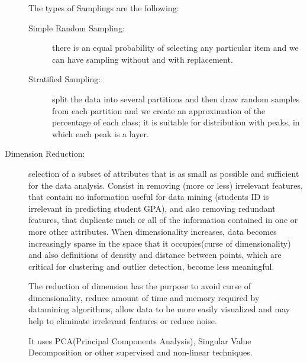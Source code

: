 \begin{description}
                             The types of Samplings are the following:
                             \begin{description}
                                 \item [Simple Random Sampling: ] there is an equal probability of selecting
                                        any particular item and we can have sampling without and with replacement.
                                 \item [Stratified Sampling: ] split the data into several partitions and 
                                        then draw random samples from each partition and we create an
                                        approximation of the percentage of each class; it is suitable 
                                        for distribution with peaks, in which each peak is a layer.
                             \end{description}
    \item [Dimension Reduction: ] selection of a subset of attributes that is as small as possible
                                  and sufficient for the data analysis.\newline
                                  Consist in removing (more or less) irrelevant features, that contain no 
                                  information useful for data mining (students ID is irrelevant in predicting 
                                  student GPA), and also removing redundant features, that duplicate much or 
                                  all of the information contained in one or more other attributes.\newline
                                  When dimensionality increases, data becomes increasingly sparse in the
                                  space that it occupies(curse of dimensionality) and also definitions of
                                  density and distance between points, which are critical for clustering
                                  and outlier detection, become less meaningful.

                                  The reduction of dimension has the purpose to avoid curse of dimensionality,
                                  reduce amount of time and memory required by datamining algorithms, 
                                  allow data to be more easily visualized and 
                                  may help to eliminate irrelevant features or reduce noise.

                                  It uses PCA(Principal Components Analysis), Singular Value Decomposition
                                  or other supervised and non-linear techniques.
                                

\end{description}
